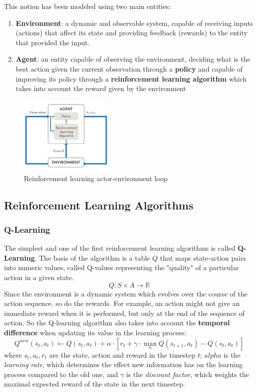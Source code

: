 \documentclass[13pt]{article}
\begin{document}
This notion has been modeled using two main entities:
\begin{enumerate}
    \item \textbf{Environment}: 
        a dynamic and observable system, capable of receiving inputs (actions) that affect its state and providing feedback (rewards) to the entity that provided the input.
    \item \textbf{Agent}: 
        an entity capable of observing the environment, deciding what is the best action given the current observation through a \textbf{policy} and capable of improving its policy through a \textbf{reinforcement learning algorithm} which takes into account the reward given by the environment
    
\end{enumerate}
\begin{figure}[h]
    \centering
    \includegraphics[width=0.4\textwidth]{assets/Reinforcement Learning/rl.png}
    \caption{Reinforcement learning actor-environment loop}
    \label{fig:_label}
\end{figure}

\subsection{Reinforcement Learning Algorithms}
\subsubsection{Q-Learning}
The simplest and one of the first reinforcement learning algorithms is called \textbf{Q-Learning}\cite{watkins1992q}. The basis of the algorithm is a table $Q$ that maps state-action pairs into numeric values, called Q-values representing the "quality" of a particular action in a given state.
\[Q: S \times A \to \mathbb{R} \]
Since the environment is a dynamic system which evolves over the course of the action sequence, so do the rewards. For example, an action might not give an immediate reward when it is performed, but only at the end of the sequence of action. So the Q-learning algorithm also takes into account the \textbf{temporal difference} when updating its value in the learning process:
\[Q^{new}(s_t, a_t) \leftarrow Q(s_t, a_t) + \alpha \cdot [r_t + \gamma \cdot \max_a{ Q(s_{t+1}, a_t)} - Q(s_t, a_t)] \]
where $s_t, a_t, r_t$ are the state, action and reward in the timestep $t$; $alpha$ is the \textit{learning rate}, which determines the effect new information has on the learning process compared to the old one, and $\gamma$ is the \textit{discount factor}, which weights the maximal expected reward of the state in the next timestep.
\end{document}
